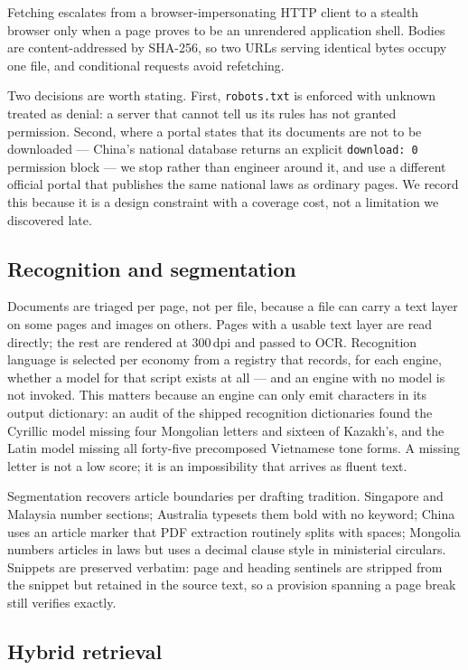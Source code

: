 \documentclass{article}
\begin{document}
Fetching escalates from a browser-impersonating HTTP client to a stealth browser
only when a page proves to be an unrendered application shell. Bodies are
content-addressed by SHA-256, so two URLs serving identical bytes occupy one
file, and conditional requests avoid refetching.

Two decisions are worth stating. First, \texttt{robots.txt} is enforced with
unknown treated as denial: a server that cannot tell us its rules has not granted
permission. Second, where a portal states that its documents are not to be
downloaded --- China's national database returns an explicit
\texttt{download:\,0} permission block --- we stop rather than engineer around
it, and use a different official portal that publishes the same national laws as
ordinary pages. We record this because it is a design constraint with a coverage
cost, not a limitation we discovered late.

\subsection{Recognition and segmentation}
\label{sec:ocr}

Documents are triaged per page, not per file, because a file can carry a text
layer on some pages and images on others. Pages with a usable text layer are
read directly; the rest are rendered at 300\,dpi and passed to OCR. Recognition
language is selected per economy from a registry that records, for each engine,
whether a model for that script exists at all --- and an engine with no model is
not invoked. This matters because an engine can only emit characters in its
output dictionary: an audit of the shipped recognition dictionaries found the
Cyrillic model missing four Mongolian letters and sixteen of Kazakh's, and the
Latin model missing all forty-five precomposed Vietnamese tone forms. A missing
letter is not a low score; it is an impossibility that arrives as fluent text.

Segmentation recovers article boundaries per drafting tradition. Singapore and
Malaysia number sections; Australia typesets them bold with no keyword; China
uses an article marker that PDF extraction routinely splits with spaces; Mongolia numbers articles in laws but uses a
decimal clause style in ministerial circulars. Snippets are preserved verbatim:
page and heading sentinels are stripped from the snippet but retained in the
source text, so a provision spanning a page break still verifies exactly.

\subsection{Hybrid retrieval}
\label{sec:retrieval}
\end{document}
